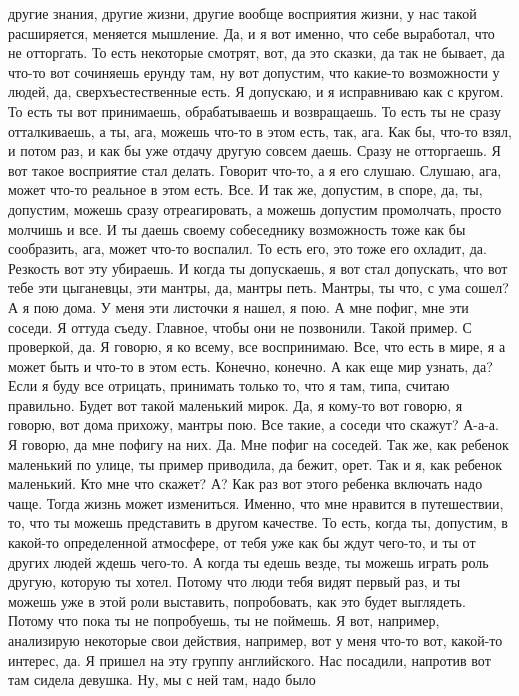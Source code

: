другие знания, другие жизни, другие
вообще восприятия жизни, у нас
такой расширяется,
меняется мышление.
Да, и я вот именно, что
себе выработал,
что не отторгать.
То есть некоторые смотрят, вот, да это
сказки, да так не бывает, да что-то
вот сочиняешь ерунду там,
ну вот допустим, что какие-то
возможности у людей, да,
сверхъестественные есть. Я допускаю,
и я исправниваю как с кругом.
То есть ты вот принимаешь,
обрабатываешь и возвращаешь.
То есть ты не сразу
отталкиваешь, а ты, ага, можешь
что-то в этом есть, так, ага.
Как бы, что-то взял, и потом раз,
и как бы уже
отдачу другую совсем даешь.
Сразу не отторгаешь.
Я вот такое восприятие стал делать.
Говорит что-то, а я его слушаю.
Слушаю, ага, может что-то
реальное в этом есть.
Все. И так же, допустим,
в споре, да, ты, допустим,
можешь сразу отреагировать, а можешь
допустим промолчать, просто молчишь
и все. И ты даешь своему собеседнику
возможность тоже
как бы сообразить, ага, может
что-то воспалил. То есть его,
это тоже его охладит, да.
Резкость вот эту
убираешь. И когда ты допускаешь,
я вот стал допускать, что вот
тебе эти цыганевцы, эти мантры,
да, мантры петь.
Мантры, ты что, с ума сошел?
А я пою дома.
У меня эти листочки я нашел,
я пою. А мне пофиг, мне эти
соседи. Я оттуда съеду.
Главное, чтобы они не позвонили.
Такой пример.
С проверкой, да.
Я говорю, я ко всему, все воспринимаю.
Все, что есть в мире, я
а может быть и что-то
в этом есть. Конечно, конечно.
А как еще мир узнать, да?
Если я буду все отрицать, принимать только то,
что я там, типа, считаю правильно.
Будет вот такой маленький
мирок. Да, я кому-то вот говорю,
я говорю, вот дома прихожу, мантры пою.
Все такие, а соседи что скажут?
А-а-а.
Я говорю, да мне пофигу на них.
Да. Мне пофиг
на соседей.
Так же, как ребенок маленький по улице, ты пример
приводила, да бежит, орет. Так и я, как
ребенок маленький. Кто мне что скажет?
А?
Как раз вот этого ребенка включать надо
чаще. Тогда жизнь
может измениться. Именно, что
мне нравится в путешествии, то, что ты можешь
представить в другом качестве.
То есть, когда ты, допустим, в какой-то
определенной атмосфере, от тебя
уже как бы ждут чего-то,
и ты от других людей ждешь чего-то.
А когда ты едешь везде,
ты можешь играть роль другую,
которую ты хотел.
Потому что люди тебя видят первый раз, и ты можешь уже
в этой роли выставить, попробовать, как это будет
выглядеть. Потому что пока ты не попробуешь,
ты не поймешь. Я вот, например,
анализирую некоторые свои действия,
например, вот у меня что-то
вот, какой-то интерес, да.
Я пришел на эту группу английского.
Нас посадили, напротив
вот там сидела девушка.
Ну, мы с ней там, надо было
